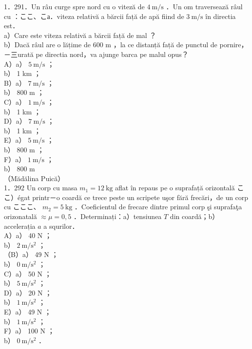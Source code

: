 \documentclass[10pt]{article}
\begin{document}
1．291．Un râu curge spre nord cu o viteză de $4 \mathrm{~m} / \mathrm{s}$ ．Un om traversează râul cu ：ここ、こа．viteza relativă a bărcii față de apă fiind de $3 \mathrm{~m} / \mathrm{s}$ în directia est．\\
a）Care este viteza relativă a bărcii față de mal ？\\
b）Dacă râul are o lățime de 600 m ，la ce distanță față de punctul de pornire， －三urată pe directia nord，va ajunge barca pe malul opus？\\
A）a） $5 \mathrm{~m} / \mathrm{s}$ ；\\
b） 1 km ；\\
B）a） $7 \mathrm{~m} / \mathrm{s}$ ；\\
b） 800 m ；\\
C）a） $1 \mathrm{~m} / \mathrm{s}$ ；\\
b） 1 km ；\\
D）a） $7 \mathrm{~m} / \mathrm{s}$ ；\\
b） 1 km ；\\
E）a） $5 \mathrm{~m} / \mathrm{s}$ ；\\
b） 800 m ；\\
F）a） $1 \mathrm{~m} / \mathrm{s}$ ；\\
b） 800 m\\
（Mădălina Puică）\\
1．292 Un corp cu masa $m_{1}=12 \mathrm{~kg}$ aflat în repaus pe o suprafață orizontală ここ）égat printr－o coardă ce trece peste un scripete uşor fără frecări，de un corp cu こここ、 $m_{2}=5 \mathrm{~kg}$ ．Coeficientul de frecare dintre primul corp şi suprafaţa orizonatală $\approx \mu=0,5$ ．Determinați：a）tensiunea $T$ din coardă；b）accelerația $a$ a squrilor．\\
A）a） 40 N ；\\
b） $2 \mathrm{~m} / \mathrm{s}^{2}$ ；\\
（B）a） 49 N ；\\
b） $0 \mathrm{~m} / \mathrm{s}^{2}$ ；\\
C）a） 50 N ；\\
b） $5 \mathrm{~m} / \mathrm{s}^{2}$ ；\\
D）a） 20 N ；\\
b） $1 \mathrm{~m} / \mathrm{s}^{2}$ ；\\
E）a） 49 N ；\\
b） $1 \mathrm{~m} / \mathrm{s}^{2}$ ；\\
F）a） 100 N ；\\
b） $0 \mathrm{~m} / \mathrm{s}^{2}$ ．\\
\end{document}
